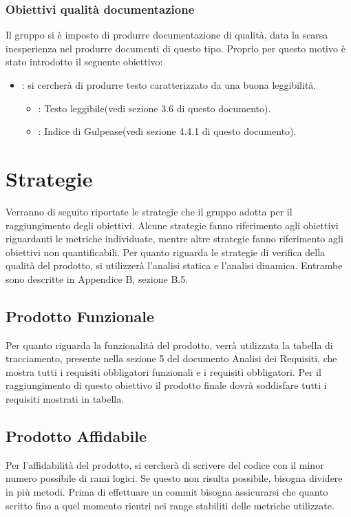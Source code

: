 \subsubsection{Obiettivi qualità documentazione}
Il gruppo \NomeGruppo{} si è imposto di produrre documentazione di qualità, data la scarsa inesperienza nel produrre documenti di questo tipo. Proprio per questo motivo è stato introdotto il seguente obiettivo:
\begin{itemize}
\item {}: si cercherà di produrre testo caratterizzato da una buona leggibilità.
\begin{itemize}
\item {}: Testo leggibile(vedi sezione 3.6 di questo documento).
\item {}: Indice di Gulpease(vedi sezione 4.4.1 di questo documento).
\end{itemize}
\end{itemize} 

\newpage

\section{Strategie}
Verranno di seguito riportate le strategie che il gruppo adotta per il raggiungimento degli obiettivi. Alcune strategie fanno riferimento agli obiettivi riguardanti le metriche individuate, mentre altre strategie fanno riferimento agli obiettivi non quantificabili.
Per quanto riguarda le strategie di verifica della qualità del prodotto, si utilizzerà l'analisi statica e l'analisi dinamica. Entrambe sono descritte in Appendice B, sezione B.5.

\subsection{Prodotto Funzionale}
Per quanto riguarda la funzionalità del prodotto, verrà utilizzata la tabella di tracciamento, presente nella sezione 5 del documento Analisi dei Requisiti, che mostra tutti i requisiti obbligatori funzionali e i requisiti obbligatori. Per il raggiungimento di questo obiettivo il prodotto finale dovrà soddisfare tutti i requisiti mostrati in tabella.

\subsection{Prodotto Affidabile}
Per l'affidabilità del prodotto, si cercherà di scrivere del codice con il minor numero possibile di rami logici. Se questo non risulta possibile, bisogna dividere in più metodi. Prima di effettuare un commit bisogna assicurarsi che quanto scritto fino a quel momento rientri nei range stabiliti delle metriche utilizzate.

